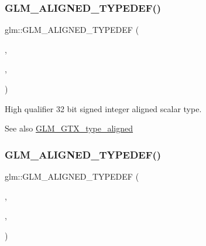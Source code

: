 \subsubsection{\texorpdfstring{G\+L\+M\+\_\+\+A\+L\+I\+G\+N\+E\+D\+\_\+\+T\+Y\+P\+E\+D\+E\+F()}{GLM\_ALIGNED\_TYPEDEF()}\hspace{0.1cm}{\footnotesize\ttfamily [31/209]}}
{\footnotesize\ttfamily glm\+::\+G\+L\+M\+\_\+\+A\+L\+I\+G\+N\+E\+D\+\_\+\+T\+Y\+P\+E\+D\+EF (\begin{DoxyParamCaption}\item[{\hyperlink{group__gtc__type__precision_ga783d077a513c1f475f6cdb406b4238c3}{highp\+\_\+int32\+\_\+t}}]{,  }\item[{aligned\+\_\+highp\+\_\+int32\+\_\+t}]{,  }\item[{4}]{ }\end{DoxyParamCaption})}

High qualifier 32 bit signed integer aligned scalar type. \begin{DoxySeeAlso}{See also}
\hyperlink{group__gtx__type__aligned}{G\+L\+M\+\_\+\+G\+T\+X\+\_\+type\+\_\+aligned} 
\end{DoxySeeAlso}
\mbox{\label{group__gtx__type__aligned_ga790cfff1ca39d0ed696ffed980809311}} 
\subsubsection{\texorpdfstring{G\+L\+M\+\_\+\+A\+L\+I\+G\+N\+E\+D\+\_\+\+T\+Y\+P\+E\+D\+E\+F()}{GLM\_ALIGNED\_TYPEDEF()}\hspace{0.1cm}{\footnotesize\ttfamily [32/209]}}
{\footnotesize\ttfamily glm\+::\+G\+L\+M\+\_\+\+A\+L\+I\+G\+N\+E\+D\+\_\+\+T\+Y\+P\+E\+D\+EF (\begin{DoxyParamCaption}\item[{\hyperlink{group__gtc__type__precision_ga0f5186bde44471133b08057cae8a51ac}{highp\+\_\+int64\+\_\+t}}]{,  }\item[{aligned\+\_\+highp\+\_\+int64\+\_\+t}]{,  }\item[{8}]{ }\end{DoxyParamCaption})}

